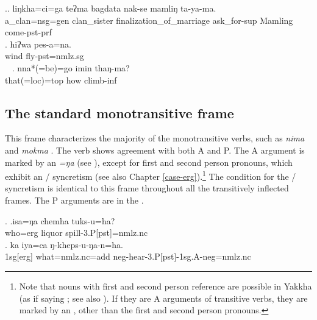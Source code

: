 \ex.\ag. liŋkha=ci=ga teʔma  bagdata nak-se mamliŋ ta-ya-ma.\\
	a\_clan{\sc =nsg=gen} clan\_sister finalization\_of\_marriage ask\_for{\sc -sup} Mamling  come{\sc [3sg]-pst-prf}\\
	 
\bg. hiʔwa pes-a=na.\\
wind fly{\sc [3sg]-pst=nmlz.sg}\\\
 
\bg. nna*(=be)=go imin thaŋ-ma?\\
that{\sc *(=loc)=top} how climb{\sc -inf} \\
 



\subsection{The standard monotransitive frame}\label{stand-tr}


\noindent
This frame characterizes the majority of the monotransitive verbs, such as \emph{nima}  and  \emph{mokma} . The verb shows agreement with both A and P. The A argument is  marked by an   \emph{=ŋa} (see \Next[a]), except for first and second person pronouns, which exhibit an / syncretism (see also Chapter \ref{case-erg}).\footnote{Note that nouns with first and second person reference are possible in Yakkha (as if saying ; see also ). If they are A arguments of transitive verbs, they are marked by an , other than the first and second person pronouns.} The condition for the / syncretism is identical to this frame throughout all the transitively inflected frames. The P arguments are in the  . 

 \ex. \ag.isa=ŋa chemha tuks-u=ha?\\
		who{\sc =erg} liquor spill{\sc -3.P[pst]=nmlz.nc}\\
 \bg. ka iya=ca ŋ-kheps-u-ŋa-n=ha.\\
  {\sc 1sg[erg]} what{\sc =nmlz.nc=add}  {\sc neg}-hear-{\sc 3.P[pst]-1sg.A-neg=nmlz.nc}\\
 \rede{I did not hear anything.}
 
